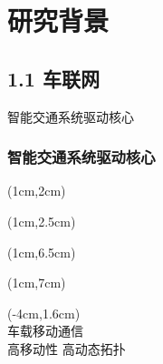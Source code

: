 \section[\englishfont 1 研究背景]{研究背景}
\subsection[\englishfont 1.1 车联网]{1.1 车联网}

\begin{frame}{智能交通系统驱动核心}
\frametitle{\englishfont 智能交通系统驱动核心}
\newBackground
\begin{center}
\begin{textblock*}{\textwidth}(1cm,2cm)
\begin{spacing}{0}
  \small \colorbox{cqublue}{\color{white}{车联网及其所驱动的}}
\end{spacing}
\end{textblock*}
\end{center}

\begin{center}
\begin{textblock*}{\textwidth}(1cm,2.5cm)
\begin{spacing}{0}
  \small \colorbox{cqublue}{\color{white}{智能交通与智慧城市}}
\end{spacing}
\end{textblock*}
\end{center}

\begin{center}
\begin{textblock*}{\textwidth}(1cm,6.5cm)
\begin{spacing}{0}
  \small \colorbox{cqublue}{\color{white}{推动汽车向}\color{yellow}{网联化、智}}
\end{spacing}
\end{textblock*}
\end{center}

\begin{center}
\begin{textblock*}{\textwidth}(1cm,7cm)
\begin{spacing}{0}
  \small \colorbox{cqublue}{\color{yellow}{能化与协同化}\color{white}{方向演进}}
\end{spacing}
\end{textblock*}
\end{center}

\begin{center}
\begin{textblock*}{\textwidth}(-4cm,1.6cm)
\\ \footnotesize 车载移动通信\\
\scriptsize 高移动性 \hspace{1em} 高动态拓扑
\end{textblock*}
\end{center}


\end{frame}

